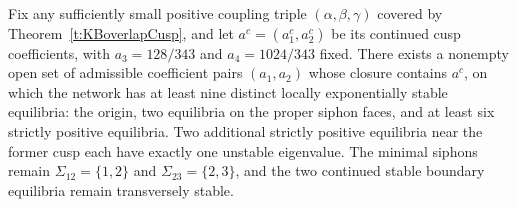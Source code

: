 Fix any sufficiently small positive coupling triple
$(\alpha,\beta,\gamma)$ covered by Theorem~\ref{t:KBoverlapCusp}, and let
$a^c=(a_1^c,a_2^c)$ be its continued cusp coefficients, with
$a_3=128/343$ and $a_4=1024/343$ fixed.
There exists a nonempty open set of admissible coefficient pairs
$(a_1,a_2)$ whose closure contains $a^c$, on which the network has
at least nine distinct locally exponentially stable equilibria:
the origin, two equilibria on the proper siphon faces, and at least
six strictly positive equilibria.
Two additional strictly positive equilibria near the former cusp
each have exactly one unstable eigenvalue.
The minimal siphons remain $\Sigma_{12}=\{1,2\}$ and
$\Sigma_{23}=\{2,3\}$, and the two continued stable boundary equilibria
remain transversely stable.
\eeC
